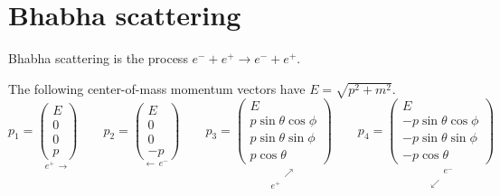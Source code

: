 

\section*{Bhabha scattering}

Bhabha scattering is the process $e^-+e^+\rightarrow e^-+e^+$.

\begin{center}
\end{center}

The following center-of-mass momentum vectors have $E=\sqrt{p^2+m^2}$.
\begin{equation*}
p_1=\underset{e^+ \, \longrightarrow}
{\begin{pmatrix}E\\0\\0\\p\end{pmatrix}}
\qquad
p_2=\underset{\longleftarrow \, e^-}
{\begin{pmatrix}E\\0\\0\\-p\end{pmatrix}}
\qquad
p_3=\underset{\substack{\phantom{e^+} \, \nearrow\\e^+ \, \phantom{\nearrow}}}
{\begin{pmatrix}E\\p\sin\theta\cos\phi\\p\sin\theta\sin\phi\\p\cos\theta\end{pmatrix}}
\qquad
p_4=\underset{\substack{\phantom{\swarrow} \, e^-\\\swarrow \, \phantom{e^-}}}
{\begin{pmatrix}E\\-p\sin\theta\cos\phi\\-p\sin\theta\sin\phi\\-p\cos\theta\end{pmatrix}}
\end{equation*}

